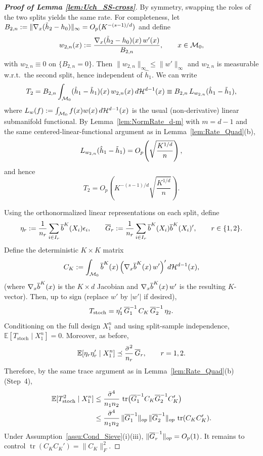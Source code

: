 \documentclass[12pt,american]{article}
\newcommand{\cH}{\mathcal{H}}
\DeclareMathOperator{\tr}{tr}
\theoremstyle{definition}
\theoremstyle{plain}
\theoremstyle{definition}
\theoremstyle{plain}
\theoremstyle{plain}
\theoremstyle{plain}
\theoremstyle{plain}
\theoremstyle{plain}
\newcommand{\E}{\mathbb{E}}
\begin{document}
\begin{proof}[\textbf{Proof of Lemma \ref{lem:Uch_SS-cross}}]
\smallskip
By symmetry, swapping the roles of the two splits yields the same rate.
For completeness, let $B_{2,n}:=\|\nabla_x(\tilde{h}_2-h_0)\|_\infty=O_p(K^{-(s-1)/d})$ and define
\[
w_{2,n}(x):=\frac{\nabla_x(\tilde{h}_2-h_0)(x)\,w'(x)}{B_{2,n}},\qquad x\in\mathcal{M}_0,
\]
with $w_{2,n}\equiv 0$ on $\{B_{2,n}=0\}$.
Then $\|w_{2,n}\|_\infty\le \|w'\|_\infty$ and $w_{2,n}$ is measurable w.r.t.\ the second split, hence independent of $\hat h_1$.
We can write
\[
T_{2}=B_{2,n}\int_{\cM_0}(\hat h_1-\td h_1)(x)\,w_{2,n}(x)\,d\cH^{d-1}(x)
\equiv B_{2,n}\,L_{w_{2,n}}(\hat h_1-\td h_1),
\]
where $L_{w}(f):=\int_{\cM_0} f(x)w(x)\,d\cH^{d-1}(x)$ is the usual (non-derivative) linear submanifold functional.
By Lemma~\ref{lem:NormRate_d-m} with $m=d-1$ and the same centered-linear-functional argument as in Lemma~\ref{lem:Rate_Quad}(b),
\[
L_{w_{2,n}}(\hat h_1-\tilde{h}_1)=O_p\!\left(\sqrt{\frac{K^{1/d}}{n}}\right),
\]
and hence
\begin{equation}\label{eq:T2_rate}
T_{2}=O_p\!\left(K^{-(s-1)/d}\sqrt{\frac{K^{1/d}}{n}}\right).
\end{equation}

\smallskip
Using the orthonormalized linear representations on each split, define
\[
\eta_r:=\frac1{n_r}\sum_{i\in I_r}\overline{b}^K(X_i)\epsilon_i,\qquad
\overline{G}_r:=\frac1{n_r}\sum_{i\in I_r}\overline{b}^K(X_i)\overline{b}^K(X_i)^{\prime},\qquad r\in\{1,2\}.
\]
Define the deterministic $K\times K$ matrix
\[
C_K
:=\int_{\cM_0}\ol b^K(x)\,\Big(\nabla_x \ol b^K(x)\,w'\Big)'\,d\cH^{d-1}(x),
\]
(where $\nabla_x \overline{b}^K(x)$ is the $K\times d$ Jacobian and $\nabla_x \overline{b}^K(x)\,w'$ is the resulting $K$-vector).
Then, up to sign (replace $w'$ by $|w'|$ if desired),
\begin{equation}\label{eq:Tstoch_matrix}
T_{\mathrm{stoch}}=\eta_1'\,\overline{G}_1^{-1}\,C_K\,\overline{G}_2^{-1}\,\eta_2.
\end{equation}
Conditioning on the full design $X_1^n$ and using split-sample independence, $\E[T_{\mathrm{stoch}}\mid X_1^n]=0$.
Moreover, as before,
\[
\E[\eta_r\eta_r'\mid X_1^n]\preceq \frac{\bar\s^2}{n_r}\,\ol G_r,\qquad r=1,2.
\]
Therefore, by the same trace argument as in Lemma~\ref{lem:Rate_Quad}(b) (Step~4),
\begin{align}
\E[T_{\mathrm{stoch}}^2\mid X_1^n]
&\le \frac{\bar\s^4}{n_1n_2}\,\tr\!\big(\ol G_1^{-1}C_K\ol G_2^{-1}C_K'\big)\notag\\
&\le \frac{\bar\s^4}{n_1n_2}\,\|\ol G_1^{-1}\|_{op}\,\|\ol G_2^{-1}\|_{op}\,\tr(C_KC_K').
\label{eq:Var_Tstoch}
\end{align}
Under Assumption~\ref{assu:Cond_Sieve}(i)(iii), $\|\overline{G}_r^{-1}\|_{op}=O_p(1)$.
It remains to control $\tr(C_KC_K')=\|C_K\|_F^2$.


\end{proof}
\end{document}

